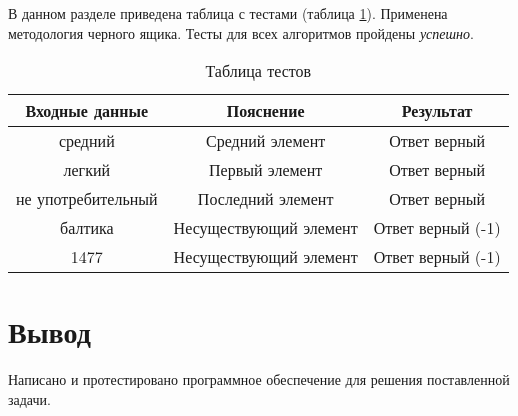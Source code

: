 В данном разделе приведена таблица с тестами (таблица \ref{table:ref1}). Применена методология черного ящика. Тесты для всех алгоритмов пройдены \textit{успешно}.
\begin{center}
	\captionsetup{justification=raggedright,singlelinecheck=off}
	\begin{table}[ht]
		\centering
		\caption{Таблица тестов}
		\label{table:ref1}
		\begin{tabular}{ |c|c|c|}
			\hline
			Входные данные    & Пояснение   	  & Результат    \\ 
			\hline
			средний			  & Средний элемент   & Ответ верный \\ \hline
			легкий 			  & Первый элемент    & Ответ верный \\ \hline
			не употребительный 		  & Последний элемент & Ответ верный \\ \hline
			балтика & Несуществующий элемент & Ответ верный (-1) \\ \hline
			1477 & Несуществующий элемент & Ответ верный (-1) \\ \hline
		\end{tabular}
	\end{table}
\end{center}

\section*{Вывод}
Написано и протестировано программное обеспечение для решения поставленной задачи.